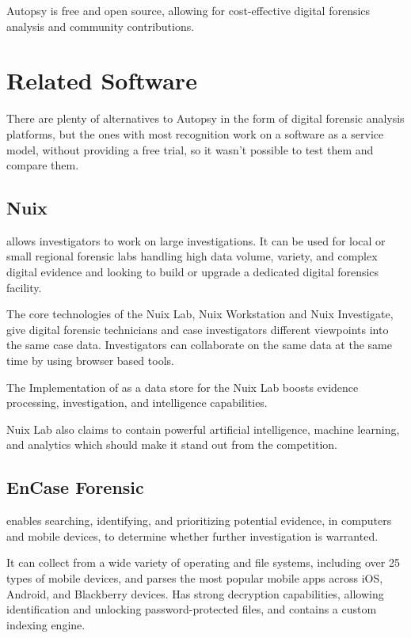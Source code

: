 Autopsy is free and open source, allowing for cost-effective digital forensics analysis and community contributions.

\section{Related Software}

There are plenty of alternatives to Autopsy in the form of digital forensic analysis platforms, but the ones with most recognition work on a software as a service model, 
without providing a free trial, so it wasn't possible to test them and compare them.

\subsection{Nuix}

 \cite{nuix} allows investigators to work on large investigations.
It can be used for local or small regional forensic labs handling high data volume, variety, and 
complex digital evidence and looking to build or upgrade a dedicated digital forensics facility.

The core technologies of the Nuix Lab, Nuix Workstation and Nuix Investigate, give digital forensic technicians and case investigators 
different viewpoints into the same case data. Investigators can collaborate on 
the same data at the same time by using browser based tools.

The Implementation of  \cite{elasticsearch} as a data store for the Nuix Lab boosts evidence processing, investigation, and intelligence capabilities. 

Nuix Lab also claims to contain powerful artificial intelligence, machine learning, and analytics which should make it stand out from the competition. 

\subsection{EnCase Forensic}

 \cite{encase} enables searching, identifying, and prioritizing potential evidence, in computers and mobile devices, to determine whether 
further investigation is warranted.

It can collect from a wide variety of operating and file systems, including over 25 types of mobile devices, and parses the most popular mobile apps across iOS, Android, and Blackberry devices.
Has strong decryption capabilities, allowing identification and unlocking password-protected files, and contains a custom indexing engine.

